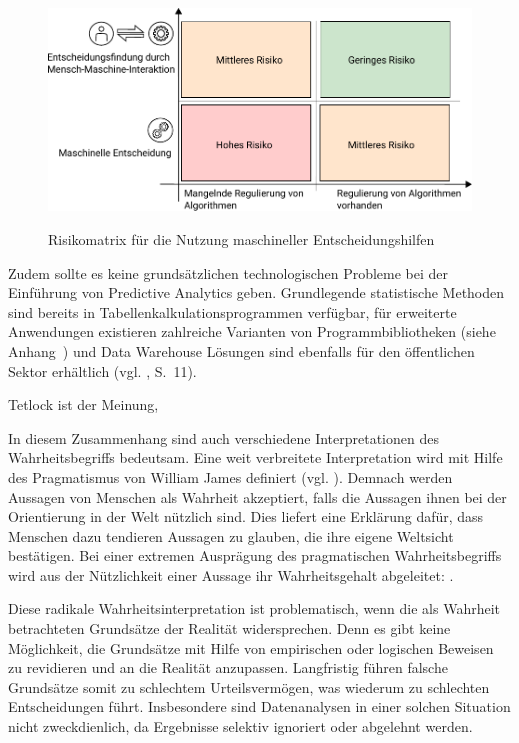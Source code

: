 \begin{figure}%
\centering
\caption{Risikomatrix für die Nutzung maschineller Entscheidungshilfen}
\includegraphics[scale=1.0]{Grafiken/Risk_Matrix_Ink.pdf} 
\label{pic:Risiko_Matrix}
\end{figure}

Zudem sollte es keine grundsätzlichen technologischen Probleme bei der Einführung von
Predictive Analytics geben. Grundlegende statistische Methoden sind bereits in
Tabellenkalkulationsprogrammen verfügbar, für erweiterte Anwendungen existieren zahlreiche
Varianten von Programmbibliotheken (siehe Anhang~\xcom) und Data Warehouse Lösungen sind
ebenfalls für den öffentlichen Sektor erhältlich (vgl. \cite{IT_Novum}, S.~11).

Tetlock ist der Meinung, 

In diesem Zusammenhang sind auch verschiedene Interpretationen des
Wahrheitsbegriffs bedeutsam. Eine weit verbreitete Interpretation wird mit
Hilfe des Pragmatismus von William James definiert (vgl. \cite{Precht}). Demnach werden
Aussagen von Menschen als Wahrheit akzeptiert, falls die Aussagen ihnen bei der
Orientierung in der Welt nützlich sind. Dies liefert eine Erklärung dafür, dass
Menschen dazu tendieren Aussagen zu glauben, die ihre eigene Weltsicht
bestätigen. Bei einer extremen Ausprägung des pragmatischen Wahrheitsbegriffs
wird aus der Nützlichkeit einer Aussage ihr Wahrheitsgehalt abgeleitet:
\grqq.

Diese radikale Wahrheitsinterpretation ist problematisch, wenn die als Wahrheit
betrachteten Grundsätze der Realität widersprechen. Denn es gibt keine
Möglichkeit, die Grundsätze mit Hilfe von empirischen oder logischen Beweisen
zu revidieren und an die Realität anzupassen. Langfristig führen falsche
Grundsätze somit zu schlechtem Urteilsvermögen, was wiederum zu schlechten
Entscheidungen führt. Insbesondere sind Datenanalysen in einer solchen Situation
nicht zweckdienlich, da Ergebnisse selektiv ignoriert oder abgelehnt werden.

